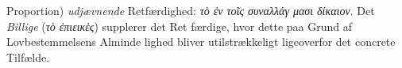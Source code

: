 \documentclass[12pt,a4paper]{book}
\newcommand{\gk}[1]{\textit{#1}}
\begin{document}
Proportion) \emph{udjævnende} Retfærdighed: \gk{τὸ ἐν τοῖς συναλλάγ\-%
μασι δίκαιον}. Det \emph{Billige} (\gk{τὸ ἐπιεικὲς}) supplerer det Ret\-%
færdige, hvor dette paa Grund af Lovbestemmelsens Alminde\-%
lighed bliver utilstrækkeligt ligeoverfor det concrete Tilfælde.
\end{document}

